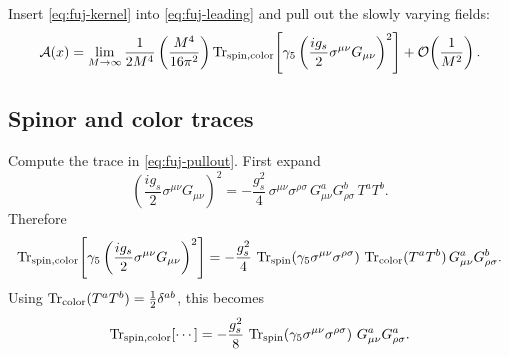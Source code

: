 \documentclass[11pt]{article}
\theoremstyle{remark}
\newcommand{\cO}{\mathcal{O}}
\begin{document}
Insert \eqref{eq:fuj-kernel} into \eqref{eq:fuj-leading} and pull out the slowly varying fields:
\begin{equation}\label{eq:fuj-pullout}
\mathcal{A}(x)=\lim_{M\to\infty}\frac{1}{2M^4}\left(\frac{M^4}{16\pi^2}\right)
\Tr_{\mathrm{spin,color}}\!\left[\gamma_5\left(\frac{i g_s}{2}\sigma^{\mu\nu}G_{\mu\nu}\right)^2\right] + \cO\!\left(\frac{1}{M^2}\right).
\end{equation}

\subsection{Spinor and color traces}
Compute the trace in \eqref{eq:fuj-pullout}.
First expand
\begin{equation}
\left(\frac{i g_s}{2}\sigma^{\mu\nu}G_{\mu\nu}\right)^2
=
-\frac{g_s^2}{4}\,\sigma^{\mu\nu}\sigma^{\rho\sigma}\,G_{\mu\nu}^a G_{\rho\sigma}^b\,T^a T^b.
\end{equation}
Therefore
\begin{equation}
\Tr_{\mathrm{spin,color}}\!\left[\gamma_5\left(\frac{i g_s}{2}\sigma^{\mu\nu}G_{\mu\nu}\right)^2\right]
=
-\frac{g_s^2}{4}\,\Tr_{\mathrm{spin}}\!\left(\gamma_5\sigma^{\mu\nu}\sigma^{\rho\sigma}\right)
\,\Tr_{\mathrm{color}}(T^a T^b)\,G_{\mu\nu}^a G_{\rho\sigma}^b.
\end{equation}
Using $\Tr_{\mathrm{color}}(T^a T^b)=\tfrac12\delta^{ab}$, this becomes
\begin{equation}\label{eq:fuj-tr1}
\Tr_{\mathrm{spin,color}}[\cdots]
=
-\frac{g_s^2}{8}\,\Tr_{\mathrm{spin}}\!\left(\gamma_5\sigma^{\mu\nu}\sigma^{\rho\sigma}\right)
\,G_{\mu\nu}^a G_{\rho\sigma}^a.
\end{equation}
\end{document}
